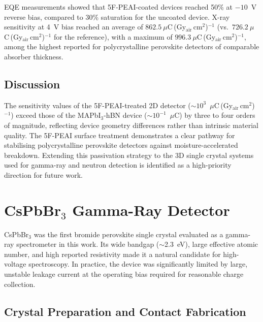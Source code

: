 EQE measurements showed that 5F-PEAI-coated devices reached 50\%
at $-10$~V reverse bias, compared to 30\% saturation for the
uncoated device.  X-ray sensitivity at 4~V bias reached an
average of $862.5~\mu$C\,(Gy$_{\mathrm{air}}$\,cm$^2$)$^{-1}$ (vs.\
$726.2~\mu$C\,(Gy$_{\mathrm{air}}$\,cm$^2$)$^{-1}$ for the reference),
with a maximum of $996.3~\mu$C\,(Gy$_{\mathrm{air}}$\,cm$^2$)$^{-1}$,
among the highest reported for polycrystalline perovskite
detectors of comparable absorber thickness.

\subsection{Discussion}
\label{sec:2d_discussion}

The sensitivity values of the 5F-PEAI-treated 2D detector
($\sim$$10^3$~$\mu$C\,(Gy$_{\mathrm{air}}$\,cm$^2$)$^{-1}$) exceed
those of the MAPbI$_3$-hBN device ($\sim$$10^{-1}$~$\mu$C)
by three to four orders of magnitude, reflecting device geometry
differences rather than intrinsic material quality.  The 5F-PEAI
surface treatment demonstrates a clear pathway for stabilising
polycrystalline perovskite detectors against moisture-accelerated
breakdown.  Extending this passivation strategy to the 3D single
crystal systems used for gamma-ray and neutron detection is
identified as a high-priority direction for future work.


\section{CsPbBr$_3$ Gamma-Ray Detector}
\label{sec:cspbbr_gamma}

CsPbBr$_3$ was the first bromide perovskite single crystal
evaluated as a gamma-ray spectrometer in this work.  Its wide
bandgap ($\sim$2.3~eV), large effective atomic number, and high
reported resistivity made it a natural candidate for high-voltage
spectroscopy.  In practice, the device was significantly limited
by large, unstable leakage current at the operating bias required
for reasonable charge collection.

\subsection{Crystal Preparation and Contact Fabrication}
\label{sec:cspbbr_fabrication}

